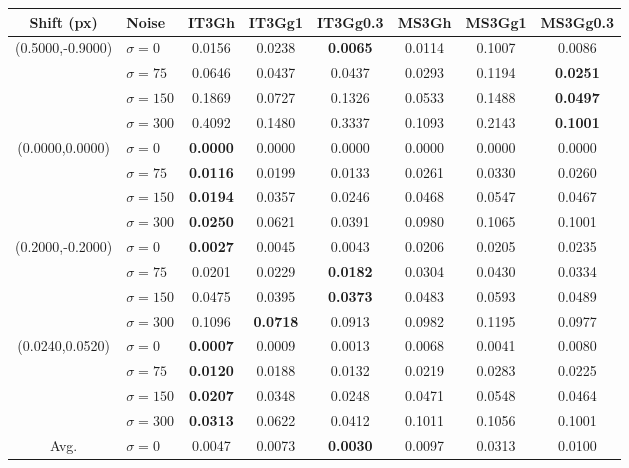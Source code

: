 \begin{table}[t]%
\small
\centering
\begin{tabular}{c|l||c|c|c|c|c|c}
\scriptsize{\textbf{Shift (px)}} & \scriptsize{\textbf{Noise}} & \scriptsize{\textbf{IT3Gh}} & \scriptsize{\textbf{IT3Gg1}} & \scriptsize{\textbf{IT3Gg0.3}} & \scriptsize{\textbf{MS3Gh}} & \scriptsize{\textbf{MS3Gg1}} & \scriptsize{\textbf{MS3Gg0.3}}\\ \hline 
\multirow{4}{*}{(0.5000,-0.9000)} & $\sigma=0$ & 0.0156 & 0.0238 & \textbf{0.0065} & 0.0114 & 0.1007 & 0.0086 \\ 
 & $\sigma=75$ & 0.0646 & 0.0437 & 0.0437 & 0.0293 & 0.1194 & \textbf{0.0251} \\ 
 & $\sigma=150$ & 0.1869 & 0.0727 & 0.1326 & 0.0533 & 0.1488 & \textbf{0.0497} \\ 
 & $\sigma=300$ & 0.4092 & 0.1480 & 0.3337 & 0.1093 & 0.2143 & \textbf{0.1001} \\ 
 \hline
\multirow{4}{*}{(0.0000,0.0000)} & $\sigma=0$ & \textbf{0.0000} & 0.0000 & 0.0000 & 0.0000 & 0.0000 & 0.0000 \\ 
 & $\sigma=75$ & \textbf{0.0116} & 0.0199 & 0.0133 & 0.0261 & 0.0330 & 0.0260 \\ 
 & $\sigma=150$ & \textbf{0.0194} & 0.0357 & 0.0246 & 0.0468 & 0.0547 & 0.0467 \\ 
 & $\sigma=300$ & \textbf{0.0250} & 0.0621 & 0.0391 & 0.0980 & 0.1065 & 0.1001 \\ 
 \hline
\multirow{4}{*}{(0.2000,-0.2000)} & $\sigma=0$ & \textbf{0.0027} & 0.0045 & 0.0043 & 0.0206 & 0.0205 & 0.0235 \\ 
 & $\sigma=75$ & 0.0201 & 0.0229 & \textbf{0.0182} & 0.0304 & 0.0430 & 0.0334 \\ 
 & $\sigma=150$ & 0.0475 & 0.0395 & \textbf{0.0373} & 0.0483 & 0.0593 & 0.0489 \\ 
 & $\sigma=300$ & 0.1096 & \textbf{0.0718} & 0.0913 & 0.0982 & 0.1195 & 0.0977 \\ 
 \hline
\multirow{4}{*}{(0.0240,0.0520)} & $\sigma=0$ & \textbf{0.0007} & 0.0009 & 0.0013 & 0.0068 & 0.0041 & 0.0080 \\ 
 & $\sigma=75$ & \textbf{0.0120} & 0.0188 & 0.0132 & 0.0219 & 0.0283 & 0.0225 \\ 
 & $\sigma=150$ & \textbf{0.0207} & 0.0348 & 0.0248 & 0.0471 & 0.0548 & 0.0464 \\ 
 & $\sigma=300$ & \textbf{0.0313} & 0.0622 & 0.0412 & 0.1011 & 0.1056 & 0.1001 \\ 
 \hline
\hline
\multirow{4}{*}{Avg.} & $\sigma=0$ & 0.0047 & 0.0073 & \textbf{0.0030} & 0.0097 & 0.0313 & 0.0100 \\ 

\end{tabular}
\end{table}
